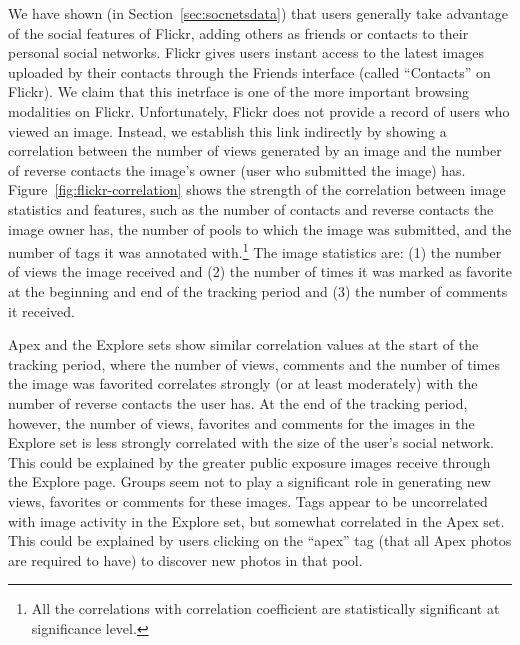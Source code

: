 \documentclass[]{article}
\newcommand{\source}[1]{\textsf{#1}}
\newcommand{\secref}[1]{Section~\ref{#1}}
\newcommand{\figref}[1]{Figure~\ref{#1}}
\begin{document}
We have shown (in \secref{sec:socnetsdata}) that users
generally take advantage of the social features of Flickr, adding others
as friends or contacts to their personal social networks. Flickr
gives users instant access to the latest images uploaded by their
contacts through the Friends interface (called ``Contacts'' on Flickr).
We claim that this inetrface is one of the more important browsing modalities on Flickr.
Unfortunately, Flickr does not provide a record of users who viewed an image.
Instead, we establish this link indirectly by showing a correlation
between the number of views generated by an image and the number of
reverse contacts the image's owner (user who submitted the image) has.
\figref{fig:flickr-correlation} shows the strength of the correlation
between image statistics and features, such as the number of
contacts and reverse contacts the image owner has,
the number of pools to which the image was submitted, and the number
of tags it was annotated with.\footnote{All the correlations with
correlation coefficient  are statistically significant at
 significance level. } The image statistics are: (1) the
number of views the image received and (2) the number of times it
was marked as favorite at the beginning and end of the tracking period and
(3) the number of comments it received.


\source{Apex} and the \source{Explore} sets show similar correlation
values at the start of the tracking period, where the number of
views, comments and the number of times the image was favorited
correlates strongly (or at least moderately) with the number of
reverse contacts the user has. At the end of the tracking period,
however, the number of views, favorites and comments for the images
in the \source{Explore} set is less strongly correlated with the
size of the user's social network. This could be explained by the greater
public exposure images receive through the Explore page. Groups seem
not to play a significant role in generating new views, favorites or
comments for these images. Tags appear to be uncorrelated with
image activity in the \source{Explore} set, but somewhat correlated
in the \source{Apex} set. This could be explained by users clicking
on the ``apex'' tag (that all \source{Apex} photos are required to
have) to discover new photos in that pool.
\end{document}
